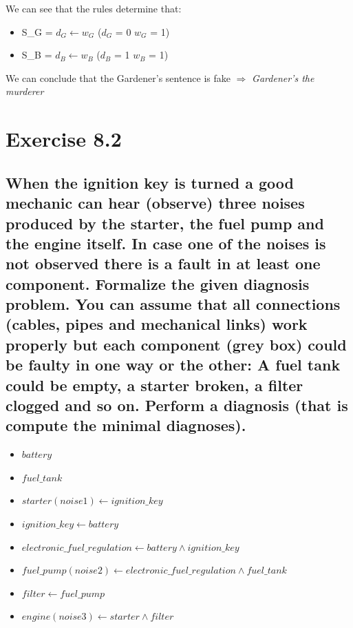 \documentclass[paper=a4, fontsize=11pt]{scrartcl} %
\numberwithin{equation}{section} %
\numberwithin{figure}{section} %
\numberwithin{table}{section} %
\begin{document}
We can see that the rules determine that:

\begin{itemize}
\item S\_G  	= $d_G \leftarrow w_G$ \hspace{4cm} ($d_G$ = 0 $w_G$ = 1)
\item S\_B 	= $d_B \leftarrow w_B$ \hspace{4cm} ($d_B$ = 1 $w_B$ = 1)\\

\end{itemize}
We can conclude that the Gardener's sentence is fake $\Rightarrow$ \textit{Gardener's the murderer}


\newpage

\section*{Exercise 8.2}
\subsection*{When the ignition key is turned a good
mechanic can hear (observe) three noises produced by the starter, the fuel pump and the engine itself. In case one of the noises is not observed there is a fault in at least one component. Formalize the given diagnosis problem. You can assume that all connections (cables, pipes and mechanical links) work properly but each component (grey box) could be faulty in one way or the other: A fuel tank could be empty, a starter broken, a filter clogged and so on. Perform a diagnosis (that is compute the minimal diagnoses). }


\begin{itemize}
	\item $ battery $
	\item $ fuel\_tank $
	\item $ starter(noise1) \leftarrow ignition\_key $
	\item $ ignition\_key \leftarrow battery $
	\item $ electronic\_fuel\_regulation \leftarrow battery \land ignition\_key $
	\item $ fuel\_pump(noise2) \leftarrow electronic\_fuel\_regulation \land fuel\_tank $
	\item $ filter \leftarrow fuel\_pump $
	\item $ engine(noise3) \leftarrow starter \land filter $
\end{itemize}






\end{document}
